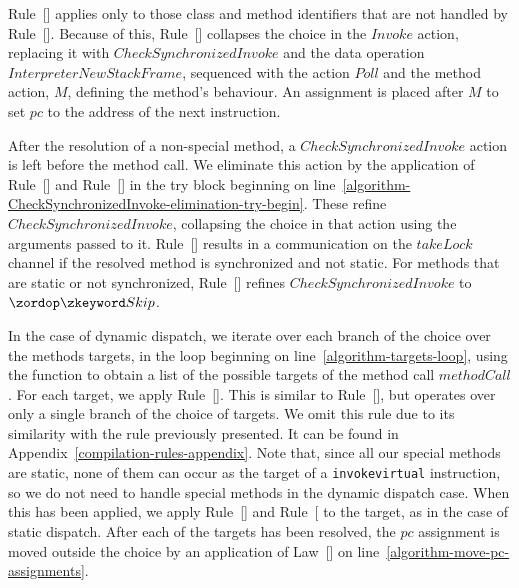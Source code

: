 Rule~[] applies only to those
class and method identifiers that are not handled by
Rule~[].
Because of this, Rule~[] collapses
the choice in the $Invoke$ action, replacing it with
$CheckSynchronizedInvoke$ and the data operation
$InterpreterNewStackFrame$, sequenced with the action $Poll$ and the
method action, $M$, defining the method's behaviour.
An assignment is placed after $M$ to set $pc$ to the address of the
next instruction.

After the resolution of a non-special method, a
$CheckSynchronizedInvoke$ action is left before the method call.
We eliminate this action by the application of
Rule~[]
and
Rule~[]
in the try block beginning on
line~\ref{algorithm-CheckSynchronizedInvoke-elimination-try-begin}.
These refine $CheckSynchronizedInvoke$, collapsing the choice in that
action using the arguments passed to it.
Rule~[]
results in a communication on the $takeLock$ channel if the resolved
method is synchronized and not static.
For methods that are static or not synchronized,
Rule~[]
refines $CheckSynchronizedInvoke$ to $\Skip$.

In the case of dynamic dispatch, we iterate over each branch of the
choice over the methods targets, in the loop beginning on
line~\ref{algorithm-targets-loop}, using the function
 to obtain a list of the possible targets
of the method call $methodCall$.
For each target, we apply
Rule~[].
This is similar to Rule~[], but
operates over only a single branch of the choice of targets.
We omit this rule due to its similarity with the rule previously
presented.
It can be found in Appendix~\ref{compilation-rules-appendix}.
Note that, since all our special methods are static, none of them can
occur as the target of a \texttt{invokevirtual} instruction, so we do
not need to handle special methods in the dynamic dispatch case. 
When this has been applied, we apply
Rule~[]
and
Rule~[
to the target, as in the case of static dispatch.
After each of the targets has been resolved, the $pc$ assignment is
moved outside the choice by an application of
Law~[] on
line~\ref{algorithm-move-pc-assignments}.

